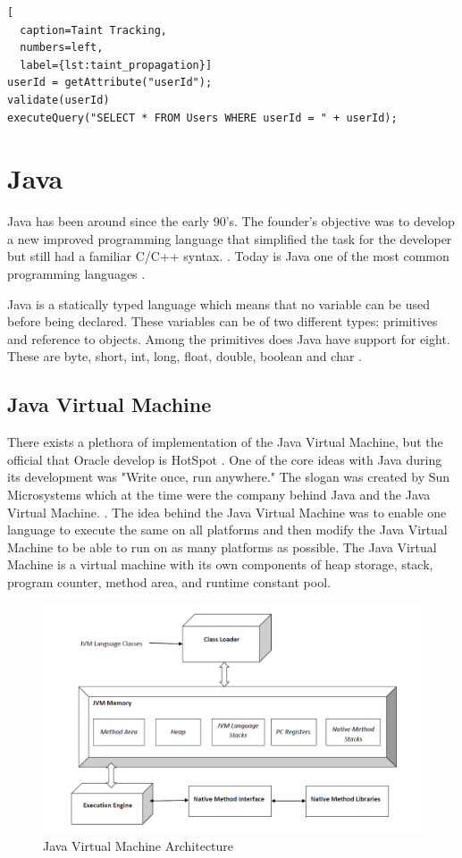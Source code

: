 \hfill
\begin{lstlisting}[
  caption=Taint Tracking,
  numbers=left,
  label={lst:taint_propagation}]
userId = getAttribute("userId");
validate(userId)
executeQuery("SELECT * FROM Users WHERE userId = " + userId);
\end{lstlisting}
\hfill



\section{Java}
\label{JavaInstrumentation}
Java has been around since the early 90's. The founder's objective was to develop a new improved programming language that simplified the task for the developer but still had a familiar C/C++ syntax. \parencite{OracleVoice}. Today is Java one of the most common programming languages \parencite{octoverse}.

Java is a statically typed language which means that no variable can be used before being declared. These variables can be of two different types: primitives and reference to objects. Among the primitives does Java have support for eight. These are byte, short, int, long, float, double, boolean and char \parencite{primjav}.



\subsection{Java Virtual Machine}
There exists a plethora of implementation of the Java Virtual Machine, but the official that Oracle develop is HotSpot \parencite{hotSpot}. One of the core ideas with Java during its development was "Write once, run anywhere." The slogan was created by Sun Microsystems which at the time were the company behind Java and the Java Virtual Machine. \parencite{Craig_2006}. The idea behind the Java Virtual Machine was to enable one language to execute the same on all platforms and then modify the Java Virtual Machine to be able to run on as many platforms as possible. The Java Virtual Machine is a virtual machine with its own components of heap storage, stack, program counter, method area, and runtime constant pool.

\begin{figure}[H]
    \centering
    \includegraphics[width=\textwidth]{images/JvmSpec7.png}
    \caption{Java Virtual Machine Architecture}
    \label{fig:JVM}
\end{figure}

